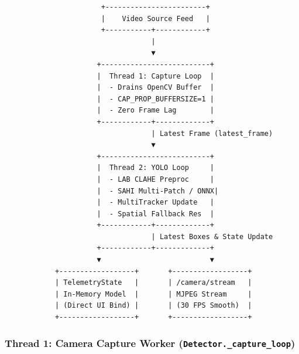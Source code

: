 \begin{verbatim}
                       +------------------------+
                       |    Video Source Feed   |
                       +-----------+------------+
                                   |
                                   ▼
                      +--------------------------+
                      |  Thread 1: Capture Loop  |
                      |  - Drains OpenCV Buffer  |
                      |  - CAP_PROP_BUFFERSIZE=1 |
                      |  - Zero Frame Lag        |
                      +------------+-------------+
                                   | Latest Frame (latest_frame)
                                   ▼
                      +--------------------------+
                      |  Thread 2: YOLO Loop     |
                      |  - LAB CLAHE Preproc     |
                      |  - SAHI Multi-Patch / ONNX|
                      |  - MultiTracker Update   |
                      |  - Spatial Fallback Res  |
                      +------------+-------------+
                                   | Latest Boxes & State Update
                      +------------+-------------+
                      ▼                          ▼
            +------------------+       +------------------+
            | TelemetryState   |       | /camera/stream   |
            | In-Memory Model  |       | MJPEG Stream     |
            | (Direct UI Bind) |       | (30 FPS Smooth)  |
            +------------------+       +------------------+
\end{verbatim}

\subsubsection{\texorpdfstring{Thread 1: Camera Capture Worker
(\texttt{Detector.\_capture\_loop})}{Thread 1: Camera Capture Worker (Detector.\_capture\_loop)}}\label{thread-1-camera-capture-worker-detector._capture_loop}


